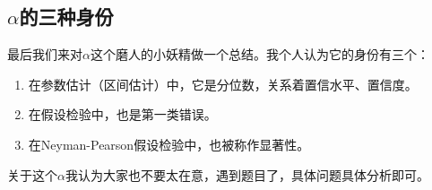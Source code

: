 \documentclass[10pt, a4paper]{article}
\begin{document}
\subsection{$\alpha$的三种身份}
最后我们来对$\alpha$这个磨人的小妖精做一个总结。我个人认为它的身份有三个：
\begin{enumerate}
    \item 在参数估计（区间估计）中，它是分位数，关系着置信水平、置信度。
    \item 在假设检验中，也是第一类错误。
    \item 在Neyman-Pearson假设检验中，也被称作显著性。
\end{enumerate}\par
关于这个$\alpha$我认为大家也不要太在意，遇到题目了，具体问题具体分析即可。
\end{document}
